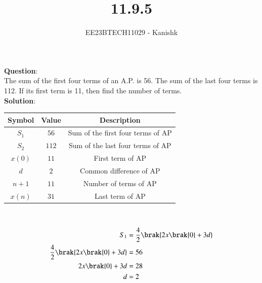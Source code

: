 \documentclass[journal,12pt,twocolumn]{IEEEtran}
\theoremstyle{remark}
\begin{document}

\vspace{3cm}

\title{11.9.5}
\author{EE23BTECH11029 - Kanishk}
\maketitle

\bigskip



\renewcommand{\thefigure}{\theenumi}
\renewcommand{\thetable}{\theenumi}
\textbf{Question}:\\ 
The sum of the first four terms of an A.P. is 56. The sum of the last four terms is
112. If its first term is 11, then find the number of terms.\\

\textbf{Solution}:\\ 

\footnotesize
\centering
\begin{tabular}{|c|c|c|}
\hline
Symbol & Value & Description\\
\hline
$S_1$ & $56$ & Sum of the first four terms of AP\\
\hline
$S_2$ & $112$& Sum of the last four terms of AP\\
\hline
$x(0)$ & $11$ & First term of AP \\
\hline
$d$ &$ 2$ & Common difference of AP\\
\hline
$n+1$ & $11$ & Number of terms of AP\\
\hline
$x(n)$ & $31$ & Last term of AP\\
\hline

\end{tabular}
\\
\small


\begin{align}
S_1&=\frac{4}{2}\brak{2x\brak{0}+3d}\\
\frac{4}{2}\brak{2x\brak{0}+3d}&=56\\
2x\brak{0}+3d&=28\\
d&=2
\end{align}
\end{document}
